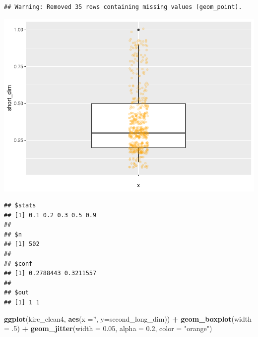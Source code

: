 \documentclass[]{article}
\newenvironment{Shaded}{\begin{snugshade}}{\end{snugshade}}
\newcommand{\KeywordTok}[1]{\textcolor[rgb]{0.13,0.29,0.53}{\textbf{#1}}}
\newcommand{\DataTypeTok}[1]{\textcolor[rgb]{0.13,0.29,0.53}{#1}}
\newcommand{\DecValTok}[1]{\textcolor[rgb]{0.00,0.00,0.81}{#1}}
\newcommand{\FloatTok}[1]{\textcolor[rgb]{0.00,0.00,0.81}{#1}}
\newcommand{\StringTok}[1]{\textcolor[rgb]{0.31,0.60,0.02}{#1}}
\newcommand{\OperatorTok}[1]{\textcolor[rgb]{0.81,0.36,0.00}{\textbf{#1}}}
\newcommand{\NormalTok}[1]{#1}
\begin{document}
\begin{verbatim}
## Warning: Removed 35 rows containing missing values (geom_point).
\end{verbatim}

\includegraphics{figs/render-unnamed-chunk-22-1.pdf}

\begin{Shaded}
\end{Shaded}

\begin{verbatim}
## $stats
## [1] 0.1 0.2 0.3 0.5 0.9
## 
## $n
## [1] 502
## 
## $conf
## [1] 0.2788443 0.3211557
## 
## $out
## [1] 1 1
\end{verbatim}

\begin{Shaded}
\begin{Highlighting}[]
\KeywordTok{ggplot}\NormalTok{(kirc_clean4, }\KeywordTok{aes}\NormalTok{(}\DataTypeTok{x =}\StringTok{''}\NormalTok{, }\DataTypeTok{y=}\NormalTok{second_long_dim)) }\OperatorTok{+}
\StringTok{     }\KeywordTok{geom_boxplot}\NormalTok{(}\DataTypeTok{width =}\NormalTok{ .}\DecValTok{5}\NormalTok{) }\OperatorTok{+}
\StringTok{     }\KeywordTok{geom_jitter}\NormalTok{(}\DataTypeTok{width =} \FloatTok{0.05}\NormalTok{, }\DataTypeTok{alpha =} \FloatTok{0.2}\NormalTok{, }\DataTypeTok{color =} \StringTok{"orange"}\NormalTok{)}
\end{Highlighting}
\end{Shaded}
\end{document}
